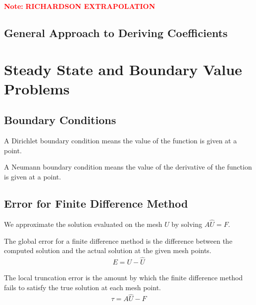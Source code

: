 \documentclass[12pt]{article}
\newcommand{\note}[1]{\textcolor{red}{\textbf{Note:} #1}}
\begin{document}
\note{\textbf{RICHARDSON EXTRAPOLATION}}

\subsection{General Approach to Deriving Coefficients}


\section{Steady State and Boundary Value Problems}



\subsection{Boundary Conditions}

\begin{definition}
A Dirichlet boundary condition means the value of the function is given at a point.
\end{definition}

\begin{definition}
A Neumann boundary condition means the value of the derivative of the function is given at a point.
\end{definition}


\subsection{Error for Finite Difference Method}
We approximate the solution evaluated on the mesh \( U \) by solving \( A\hat{U} = F \).

\begin{definition}
The global error for a finite difference method is the difference between the computed solution and the actual solution at the given mesh points.
\begin{align*}
    E = U - \hat{U}
\end{align*}
\end{definition}

\begin{definition}
The local truncation error is the amount by which the finite difference method fails to satisfy the true solution at each mesh point.
\begin{align*}
    \tau = A\hat{U} - F
\end{align*}
\end{definition}
\end{document}
